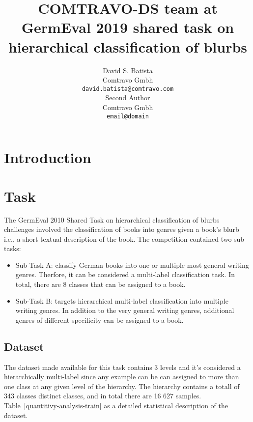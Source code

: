 \documentclass[11pt]{article}
\title{COMTRAVO-DS team at GermEval 2019 shared task on hierarchical classification of blurbs}
\author{David S. Batista \\
  Comtravo Gmbh \\
  {\tt david.batista@comtravo.com} \\\And
  Second Author \\
  Comtravo Gmbh \\
  {\tt email@domain} \\}
\begin{document}
\maketitle
\begin{abstract}

\end{abstract}

\section{Introduction}

\section{Task}

The GermEval 2010 Shared Task on hierarchical classification of blurbs challenges involved the
classification of books into genres given a book's blurb i.e., a short textual description of the
book. The competition contained two sub-tasks:

\begin{itemize}

\item Sub-Task A: classify German books into one or multiple most general writing genres. Therfore,
it can be considered a multi-label classification task. In total, there are 8 classes that can be
assigned to a book.

\item Sub-Task B: targets hierarchical multi-label classification into multiple writing genres. In
addition to the very general writing genres, additional genres of different specificity can
be assigned to a book.

\end{itemize}


\subsection{Dataset}

The dataset made available for this task contains 3 levels and it's considered a hierarchically
multi-label since any example can be can assigned to more than one class at any given level of
the hierarchy. The hierarchy contains a totall of 343 classes distinct classes, and in total there
are 16 627 samples. Table~\ref{quantitivy-analysis-train} as a detailed statistical description of
the dataset.

\end{document}
